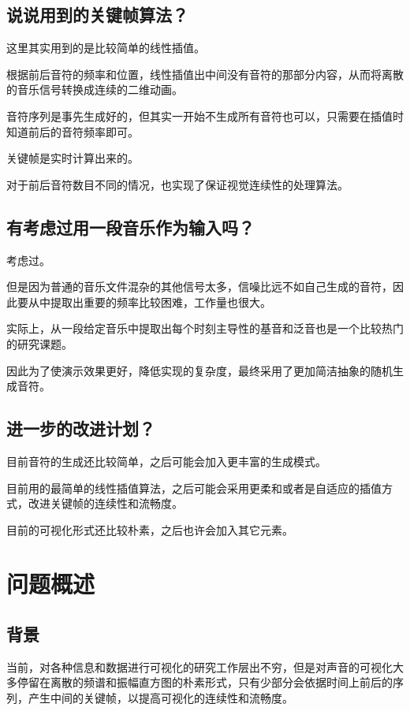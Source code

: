 \documentclass[a4paper, 12pt]{article}
\begin{document}
\subsection{说说用到的关键帧算法？}

这里其实用到的是比较简单的线性插值。

根据前后音符的频率和位置，线性插值出中间没有音符的那部分内容，从而将离散的音乐信号转换成连续的二维动画。

音符序列是事先生成好的，但其实一开始不生成所有音符也可以，只需要在插值时知道前后的音符频率即可。

关键帧是实时计算出来的。

对于前后音符数目不同的情况，也实现了保证视觉连续性的处理算法。

\subsection{有考虑过用一段音乐作为输入吗？}

考虑过。

但是因为普通的音乐文件混杂的其他信号太多，信噪比远不如自己生成的音符，因此要从中提取出重要的频率比较困难，工作量也很大。

实际上，从一段给定音乐中提取出每个时刻主导性的基音和泛音也是一个比较热门的研究课题。

因此为了使演示效果更好，降低实现的复杂度，最终采用了更加简洁抽象的随机生成音符。

\subsection{进一步的改进计划？}

目前音符的生成还比较简单，之后可能会加入更丰富的生成模式。

目前用的最简单的线性插值算法，之后可能会采用更柔和或者是自适应的插值方式，改进关键帧的连续性和流畅度。

目前的可视化形式还比较朴素，之后也许会加入其它元素。


\section{问题概述}

\subsection{背景}
当前，对各种信息和数据进行可视化的研究工作层出不穷，但是对声音的可视化大多停留在离散的频谱和振幅直方图的朴素形式，只有少部分会依据时间上前后的序列，产生中间的关键帧，以提高可视化的连续性和流畅度。
\end{document}
